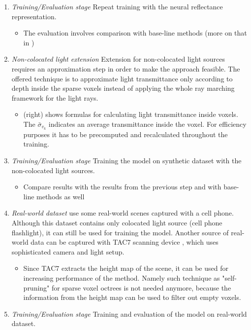 \documentclass[english]{article}
\begin{document}
\begin{enumerate}
    \item \textit{Training/Evaluation stage}
    Repeat training with the neural reflectance representation.
    \begin{itemize}
        \item The evaluation involves comparison with base-line methods (more on that in )
    \end{itemize}

    \item \textit{Non-colocated light extension}
    Extension for non-colocated light sources requires an approximation step in order to make the approach feasible.
    The offered technique is to approximate light transmittance only according to depth inside the sparse voxels instead of applying the whole ray marching framework for the light rays.
    \begin{itemize}
        \item {} (right) shows formulas for calculating light transmittance inside voxels. The $\bar\sigma_{v_k}$ indicates an average transmittance inside the voxel. For efficiency purposes it has to be precomputed and recalculated throughout the training.
    \end{itemize}
    
    \item \textit{Training/Evaluation stage}
    Training the model on synthetic dataset with the non-colocated light sources.
    \begin{itemize}
        \item Compare results with the results from the previous step and with base-line methods as well
    \end{itemize}
    
    \item \textit{Real-world dataset}
    \cite{nrf2020} use some real-world scenes captured with a cell phone.
    Although this dataset contains only colocated light source (cell phone flashlight), it can still be used for training the model.
    Another source of real-world data can be captured with TAC7 scanning device \cite{tac7}, which uses sophisticated camera and light setup.
    \begin{itemize}
        \item Since TAC7 extracts the height map of the scene, it can be used for increasing performance of the method. Namely such technique as "self-pruning" for sparse voxel octrees is not needed anymore, because the information from the height map can be used to filter out empty voxels.
    \end{itemize}
    
    \item \textit{Training/Evaluation stage}
    Training and evaluation of the model on real-world dataset.
\end{enumerate}
\end{document}
